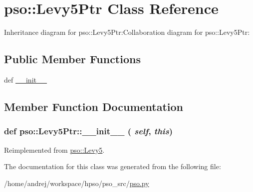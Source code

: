 \hypertarget{classpso_1_1Levy5Ptr}{
\section{pso::Levy5Ptr Class Reference}
\label{classpso_1_1Levy5Ptr}
}
Inheritance diagram for pso::Levy5Ptr:Collaboration diagram for pso::Levy5Ptr:\subsection*{Public Member Functions}
\begin{CompactItemize}
\item 
def \hyperlink{classpso_1_1Levy5Ptr_01f10ada921645bf0be74d8073c0c764}{\_\-\_\-init\_\-\_\-}
\end{CompactItemize}


\subsection{Member Function Documentation}
\hypertarget{classpso_1_1Levy5Ptr_01f10ada921645bf0be74d8073c0c764}{
\subsubsection{\setlength{\rightskip}{0pt plus 5cm}def pso::Levy5Ptr::\_\-\_\-init\_\-\_\- ( {\em self}, \/   {\em this})}}
\label{classpso_1_1Levy5Ptr_01f10ada921645bf0be74d8073c0c764}




Reimplemented from \hyperlink{classpso_1_1Levy5_3499ee5a0ad4b26fb90f4aeb8b899585}{pso::Levy5}.

The documentation for this class was generated from the following file:\begin{CompactItemize}
\item 
/home/andrej/workspace/hpso/pso\_\-src/\hyperlink{pso_8py}{pso.py}\end{CompactItemize}
